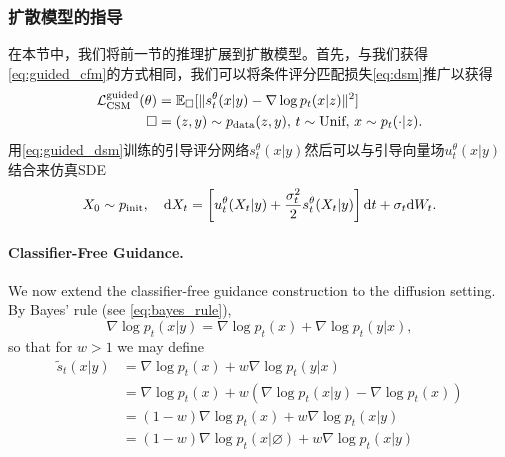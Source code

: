 \subsubsection{扩散模型的指导}
在本节中，我们将前一节的推理扩展到扩散模型。首先，与我们获得\cref{eq:guided_cfm}的方式相同，我们可以将条件评分匹配损失\cref{eq:dsm}推广以获得
\begin{align}
    \label{eq:guided_dsm}
    \mathcal{L}_{\text{CSM}}^{\text{guided}}(\theta) &= \mathbb{E}_{\square}[\|s_t^\theta(x|y) - \nabla\log p_t(x|z)\|^2]\\
    \square &= (z,y)\sim p_{\rm{data}}(z,y), \,t\sim \text{Unif},\,x\sim p_t(\cdot|z).
\end{align}
用\cref{eq:guided_dsm}训练的引导评分网络$s_t^\theta(x|y)$然后可以与引导向量场$u_t^\theta(x|y)$结合来仿真SDE
\begin{equation*}
    X_0 \sim p_{\rm{init}},\quad \mathrm{d} X_t = \left[u_t^\theta(X_t|y)+\frac{\sigma_t^2}{2}s_t^\theta(X_t|y)\right]\mathrm{d} t + \sigma_t\mathrm{d} W_t.
\end{equation*}

\paragraph{Classifier-Free Guidance.} We now extend the classifier-free guidance construction to the diffusion setting. By Bayes' rule (see \cref{eq:bayes_rule}),
\begin{equation*}
    \nabla \log p_t(x|y) = \nabla \log p_t(x) + \nabla \log p_t(y|x),
\end{equation*}
so that for  $w > 1$ we may define
\begin{align*}
    \tilde{s}_t(x|y) &= \nabla \log p_t(x) + w \nabla \log p_t(y|x)\\
                    &= \nabla \log p_t(x) + w (\nabla \log p_t(x|y) - \nabla \log p_t(x))\\
                    &= (1-w) \nabla \log p_t(x) + w \nabla \log p_t(x|y)\\
                    &= (1-w) \nabla \log p_t(x|\varnothing) + w \nabla \log p_t(x|y)
\end{align*}

